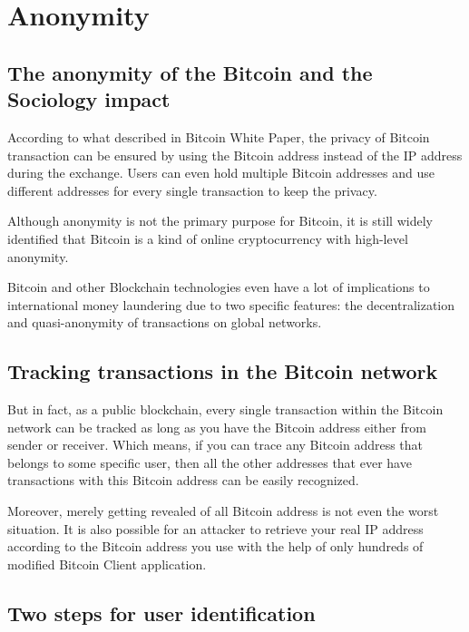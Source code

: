 \documentclass[runningheads]{llncs}
\begin{document}

\section{Anonymity}

\subsection{The anonymity of the Bitcoin and the Sociology impact}

According to what described in Bitcoin White Paper,  the privacy of Bitcoin transaction can be ensured by using the Bitcoin address instead of the IP address during the exchange. Users can even hold multiple Bitcoin addresses and use different addresses for every single transaction to keep the privacy\cite{nakamoto2008bitcoin}. 

Although anonymity is not the primary purpose for Bitcoin, it is still widely identified that Bitcoin is a kind of online cryptocurrency with high-level anonymity. 

Bitcoin and other Blockchain technologies even have a lot of implications to international money laundering due to two specific features: the decentralization and quasi-anonymity of transactions on global networks\cite{campbell2017bitcoin}. 

\subsection{Tracking transactions in the Bitcoin network}

But in fact, as a public blockchain, every single transaction within the Bitcoin network can be tracked as long as you have the Bitcoin address either from sender or receiver. Which means, if you can trace any Bitcoin address that belongs to some specific user, then all the other addresses that ever have transactions with this Bitcoin address can be easily recognized.

Moreover, merely getting revealed of all Bitcoin address is not even the worst situation. It is also possible for an attacker to retrieve your real IP address according to the Bitcoin address you use with the help of only hundreds of modified Bitcoin Client application\cite{juhasz2018bayesian}.

\subsection{Two steps for user identification}
\end{document}
